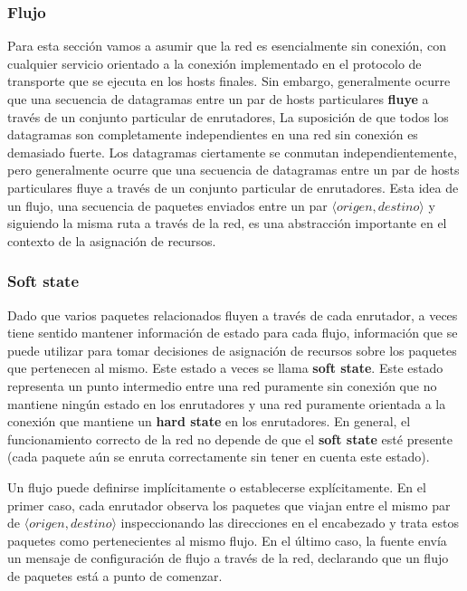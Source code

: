 \subsubsection*{Flujo} 
Para esta sección vamos a asumir que la red es esencialmente sin conexión, con cualquier servicio orientado a la conexión implementado en el protocolo de transporte que se ejecuta en los hosts finales. Sin embargo, generalmente ocurre que una secuencia de datagramas entre un par de hosts particulares \textbf{fluye} a través de un conjunto particular de enrutadores,  La suposición de que todos los datagramas son completamente independientes en una red sin conexión es demasiado fuerte. Los datagramas ciertamente se conmutan independientemente, pero generalmente ocurre que una secuencia de datagramas entre un par de hosts particulares fluye a través de un conjunto particular de enrutadores. Esta idea de un flujo, una secuencia de paquetes enviados entre un par \(\langle origen , destino\rangle\) y siguiendo la misma ruta a través de la red, es una abstracción importante en el contexto de la asignación de recursos.

\subsubsection*{Soft state}
Dado que varios paquetes relacionados fluyen a través de cada enrutador, a veces tiene sentido mantener información de estado para cada flujo, información que se puede utilizar para tomar decisiones de asignación de recursos sobre los paquetes que pertenecen al mismo. Este estado a veces se llama \textbf{soft state}. Este estado representa un punto intermedio entre una red puramente sin conexión que no mantiene ningún estado en los enrutadores y una red puramente orientada a la conexión que mantiene un \textbf{hard state} en los enrutadores. En general, el funcionamiento correcto de la red no depende de que el \textbf{soft state} esté presente (cada paquete aún se enruta correctamente sin tener en cuenta este estado).

Un flujo puede definirse implícitamente o establecerse explícitamente. En el primer caso, cada enrutador observa los paquetes que viajan entre el mismo par de \(\langle origen , destino\rangle\) inspeccionando las direcciones en el encabezado y trata estos paquetes como pertenecientes al mismo flujo. En el último caso, la fuente envía un mensaje de configuración de flujo a través de la red, declarando que un flujo de paquetes está a punto de comenzar.

